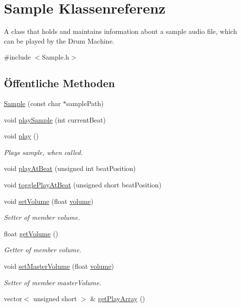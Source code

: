 \hypertarget{class_sample}{}\section{Sample Klassenreferenz}
\label{class_sample}


A class that holds and maintains information about a sample audio file, which can be played by the Drum Machine.  




{\ttfamily \#include $<$Sample.\+h$>$}

\subsection*{Öffentliche Methoden}
\begin{DoxyCompactItemize}
\item 
\hyperlink{class_sample_a7aea6b090998a430341aa6d1d6222c63}{Sample} (const char $\ast$sample\+Path)
\item 
void \hyperlink{class_sample_a5c016261d1f93a28c323a53af3ee545a}{play\+Sample} (int current\+Beat)
\item 
void \hyperlink{class_sample_a2ccc1c5571e54ba6725714cd795698f3}{play} ()
\begin{DoxyCompactList}\small\item\em Plays sample, when called. \end{DoxyCompactList}\item 
void \hyperlink{class_sample_a287eada639aedccb8908d1ae6bf67874}{play\+At\+Beat} (unsigned int beat\+Position)
\item 
void \hyperlink{class_sample_a4bf009853c35f7a29955fa2554d8e799}{toggle\+Play\+At\+Beat} (unsigned short beat\+Position)
\item 
void \hyperlink{class_sample_ae298bfb5c8c1c3c867fa962e799a2fa5}{set\+Volume} (float \hyperlink{class_sample_a74a4b4799b2bdec9fdde363992b9cec8}{volume})
\begin{DoxyCompactList}\small\item\em Setter of member volume. \end{DoxyCompactList}\item 
float \hyperlink{class_sample_a9f3c251183832a53ec1967331d022575}{get\+Volume} ()
\begin{DoxyCompactList}\small\item\em Getter of member volume. \end{DoxyCompactList}\item 
void \hyperlink{class_sample_af8ad49b65a536c535393e3968516b871}{set\+Master\+Volume} (float \hyperlink{class_sample_a74a4b4799b2bdec9fdde363992b9cec8}{volume})
\begin{DoxyCompactList}\small\item\em Setter of member master\+Volume. \end{DoxyCompactList}\item 
vector$<$ unsigned short $>$ \& \hyperlink{class_sample_a5728b28ce6f6ee19a1b84eddded4fa97}{get\+Play\+Array} ()
\end{DoxyCompactItemize}
